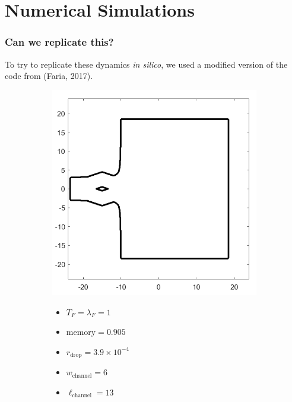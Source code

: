 \documentclass[compress,10pt,usenames,dvipsnames]{beamer}
\theoremstyle{remark}
\begin{document}
\section{Numerical Simulations}
\begin{frame}\frametitle{Can we replicate this?}
	To try to replicate these dynamics \emph{in silico}, we used a modified version of the code from (Faria, 2017).
	
	\begin{figure}
		\begin{subfigure}[t]{.5\textwidth}
			\centering
			\includegraphics[scale=0.25]{Figures/setup.png}
			
		\end{subfigure}%
		\begin{subfigure}[t]{.5\textwidth}
			\vspace*{-1.5in}
			\begin{itemize}
				\item $T_F = \lambda_F = 1$
				\item $\text{memory} = 0.905$
				\item $r_\text{drop} = 3.9\times 10^{-4}$
				\item $w_\text{channel} = 6$
				\item $\ell_\text{channel} = 13$
			\end{itemize}
		\end{subfigure}
	\end{figure}
\end{frame}
\end{document}
